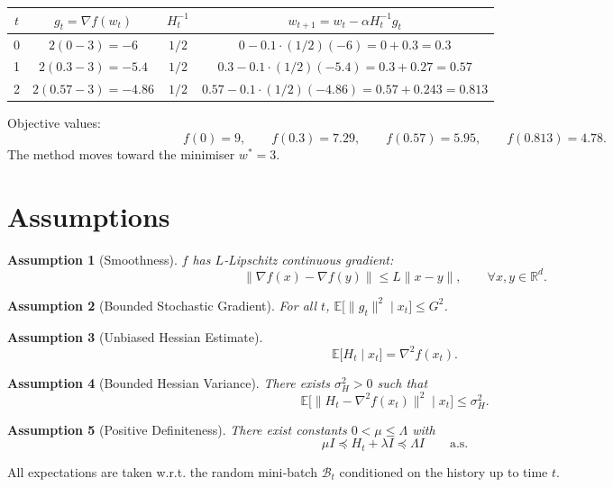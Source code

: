 \documentclass{article}
\newtheorem{assumption}{Assumption}[section]
\begin{document}
\begin{center}
\begin{tabular}{c|c|c|c}
$t$ & $g_{t}= \nabla f(w_{t})$ & $H_{t}^{-1}$ & $w_{t+1}=w_{t}-\alpha H_{t}^{-1}g_{t}$ \\ \hline
0 & $2(0-3)=-6$ & $1/2$ & $0-0.1\cdot(1/2)(-6)=0+0.3=0.3$ \\
1 & $2(0.3-3)=-5.4$ & $1/2$ & $0.3-0.1\cdot(1/2)(-5.4)=0.3+0.27=0.57$ \\
2 & $2(0.57-3)=-4.86$ & $1/2$ & $0.57-0.1\cdot(1/2)(-4.86)=0.57+0.243=0.813$\\
\end{tabular}
\end{center}

Objective values:
\[
f(0)=9,\qquad f(0.3)=7.29,\qquad f(0.57)=5.95,\qquad f(0.813)=4.78.
\]
The method moves toward the minimiser $w^{*}=3$.

\newpage

\section*{Assumptions}
\begin{assumption}[Smoothness]\label{ass:smooth}
$f$ has $L$‑Lipschitz continuous gradient:
\[
\|\nabla f(x)-\nabla f(y)\|\le L\|x-y\|,\qquad\forall x,y\in\mathbb{R}^{d}.
\]
\end{assumption}
\begin{assumption}[Bounded Stochastic Gradient]\label{ass:grad}
For all $t$, $\mathbb{E}\!\big[\|g_{t}\|^{2}\mid x_{t}\big]\le G^{2}$.
\end{assumption}
\begin{assumption}[Unbiased Hessian Estimate]\label{ass:hessian-unbiased}
\[
\mathbb{E}\!\big[H_{t}\mid x_{t}\big]=\nabla^{2}f(x_{t}).
\]
\end{assumption}
\begin{assumption}[Bounded Hessian Variance]\label{ass:hessian-var}
There exists $\sigma_{H}^{2}>0$ such that
\[
\mathbb{E}\!\big[\|H_{t}-\nabla^{2}f(x_{t})\|^{2}\mid x_{t}\big]\le\sigma_{H}^{2}.
\]
\end{assumption}
\begin{assumption}[Positive Definiteness]\label{ass:posdef}
There exist constants $0<\mu\le\Lambda$ with
\[
\mu I\preceq H_{t}+\lambda I\preceq \Lambda I\qquad\text{a.s.}
\]
\end{assumption}
All expectations are taken w.r.t. the random mini‑batch $\mathcal{B}_{t}$ conditioned on the history up to time $t$.
\end{document}
